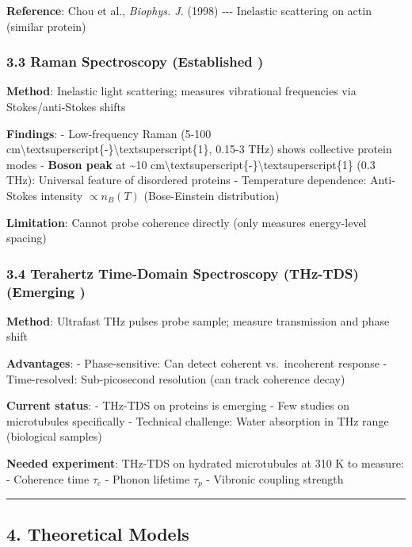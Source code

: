 \textbf{Reference}: Chou et al., \emph{Biophys. J.} (1998) -\/-\/-
Inelastic scattering on actin (similar protein)

\subsubsection{3.3 Raman Spectroscopy (Established
)}\label{raman-spectroscopy-established}

\textbf{Method}: Inelastic light scattering; measures vibrational
frequencies via Stokes/anti-Stokes shifts

\textbf{Findings}: - Low-frequency Raman (5-100
cm\textbackslash textsuperscript\{-\}\textbackslash textsuperscript\{1\},
0.15-3 THz) shows collective protein modes - \textbf{Boson peak} at
\textasciitilde10
cm\textbackslash textsuperscript\{-\}\textbackslash textsuperscript\{1\}
(0.3 THz): Universal feature of disordered proteins - Temperature
dependence: Anti-Stokes intensity \(\propto n_B(T)\) (Bose-Einstein
distribution)

\textbf{Limitation}: Cannot probe coherence directly (only measures
energy-level spacing)

\subsubsection{3.4 Terahertz Time-Domain Spectroscopy (THz-TDS)
(Emerging )}\label{terahertz-time-domain-spectroscopy-thz-tds-emerging}

\textbf{Method}: Ultrafast THz pulses probe sample; measure transmission
and phase shift

\textbf{Advantages}: - Phase-sensitive: Can detect coherent
vs.~incoherent response - Time-resolved: Sub-picosecond resolution (can
track coherence decay)

\textbf{Current status}: - THz-TDS on proteins is emerging - Few studies
on microtubules specifically - Technical challenge: Water absorption in
THz range (biological samples)

\textbf{Needed experiment}: THz-TDS on hydrated microtubules at 310 K to
measure: - Coherence time \(\tau_c\) - Phonon lifetime \(\tau_p\) -
Vibronic coupling strength

\begin{center}\rule{0.5\linewidth}{0.5pt}\end{center}

\subsection{4. Theoretical Models}\label{theoretical-models}

